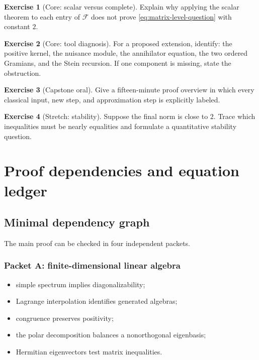 \documentclass[11pt,oneside,openany]{book}
\theoremstyle{definition}
\newtheorem{exercise}{Exercise}[chapter]
\theoremstyle{remark}
\begin{document}
\begin{exercise}[Core: scalar versus complete]
Explain why applying the scalar theorem to each entry of
\(\mathcal F\) does not prove \eqref{eq:matrix-level-question} with
constant \(2\).
\end{exercise}

\begin{exercise}[Core: tool diagnosis]
For a proposed extension, identify: the positive kernel, the nuisance
module, the annihilator equation, the two ordered Gramians, and the
Stein recursion.  If one component is missing, state the obstruction.
\end{exercise}

\begin{exercise}[Capstone oral]
Give a fifteen-minute proof overview in which every classical input,
new step, and approximation step is explicitly labeled.
\end{exercise}

\begin{exercise}[Stretch: stability]
Suppose the final norm is close to \(2\).  Trace which inequalities
must be nearly equalities and formulate a quantitative stability
question.
\end{exercise}

\appendix

\chapter{Proof dependencies and equation ledger}
\label{app:dependencies}

\section{Minimal dependency graph}

The main proof can be checked in four independent packets.

\subsection*{Packet A: finite-dimensional linear algebra}

\begin{itemize}
  \item simple spectrum implies diagonalizability;
  \item Lagrange interpolation identifies generated algebras;
  \item congruence preserves positivity;
  \item the polar decomposition balances a nonorthogonal eigenbasis;
  \item Hermitian eigenvectors test matrix inequalities.
\end{itemize}
\end{document}
